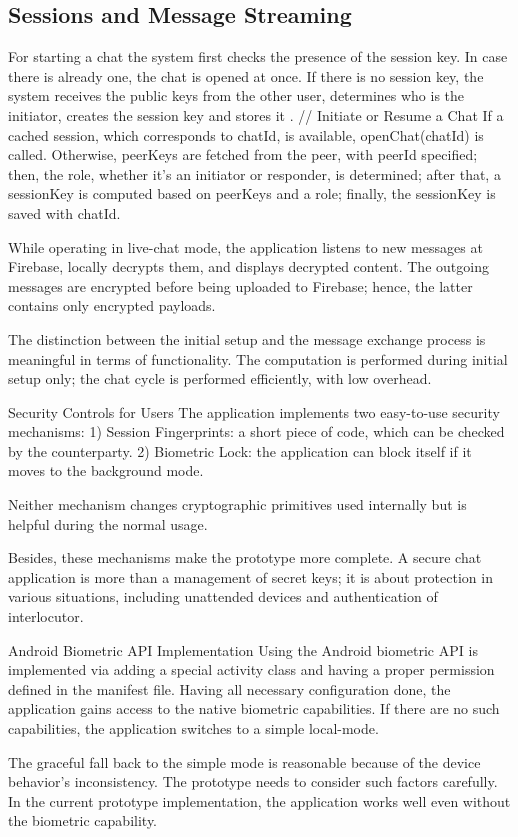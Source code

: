 \subsection{Sessions and Message Streaming}
For starting a chat the system first checks the presence of the session key. In case there is already one, the chat is opened at once. If there is no session key, the system receives the public keys from the other user, determines who is the initiator, creates the session key and stores it \cite{pqxdh}.
// Initiate or Resume a Chat
If a cached session, which corresponds to chatId, is available, openChat(chatId) is called. Otherwise, peerKeys are fetched from the peer, with peerId specified; then, the role, whether it's an initiator or responder, is determined; after that, a sessionKey is computed based on peerKeys and a role; finally, the sessionKey is saved with chatId.

While operating in live-chat mode, the application listens to new messages at Firebase, locally decrypts them, and displays decrypted content. The outgoing messages are encrypted before being uploaded to Firebase; hence, the latter contains only encrypted payloads.

The distinction between the initial setup and the message exchange process is meaningful in terms of functionality. The computation is performed during initial setup only; the chat cycle is performed efficiently, with low overhead.

Security Controls for Users
The application implements two easy-to-use security mechanisms:
1) Session Fingerprints: a short piece of code, which can be checked by the counterparty.
2) Biometric Lock: the application can block itself if it moves to the background mode.

Neither mechanism changes cryptographic primitives used internally but is helpful during the normal usage.

Besides, these mechanisms make the prototype more complete. A secure chat application is more than a management of secret keys; it is about protection in various situations, including unattended devices and authentication of interlocutor.

Android Biometric API Implementation
Using the Android biometric API is implemented via adding a special activity class and having a proper permission defined in the manifest file. Having all necessary configuration done, the application gains access to the native biometric capabilities. If there are no such capabilities, the application switches to a simple local-mode.

The graceful fall back to the simple mode is reasonable because of the device behavior's inconsistency. The prototype needs to consider such factors carefully. In the current prototype implementation, the application works well even without the biometric capability.